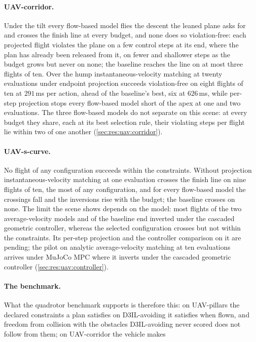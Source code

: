 \paragraph{UAV-corridor.} Under the tilt every flow-based model flies the descent the leaned plane asks
for and crosses the finish line at every budget, and none does so violation-free: each projected flight
violates the plane on a few control steps at its end, where the plan has already been released from it,
on fewer and shallower steps as the budget grows but never on none; the baseline reaches the line on at most three flights
of ten. Over the hump instantaneous-velocity matching at twenty evaluations under endpoint projection
succeeds violation-free on eight flights of ten at $291$\,ms per action, ahead of the baseline's best,
six at $626$\,ms, while per-step projection stops every flow-based model short of the apex at one and two
evaluations. The three flow-based models do not separate on this scene: at every budget they share, each
at its best selection rule, their violating steps per flight lie within two of one another
(\autoref{sec:res:uav:corridor}).

\paragraph{UAV-s-curve.} No flight of any configuration succeeds within the constraints. Without projection
instantaneous-velocity matching at one evaluation crosses the finish line on nine flights of ten, the most
of any configuration, and for every flow-based model the crossings fall and the inversions rise with the
budget; the baseline crosses on none. The limit the scene shows depends on the model: most flights of the
two average-velocity models and of the baseline end inverted under the cascaded geometric controller,
whereas the selected configuration crosses but not within the constraints. Its per-step projection and the
controller comparison on it are pending; the pilot on analytic average-velocity matching at ten evaluations
arrives under MuJoCo MPC where it inverts under the cascaded geometric controller
(\autoref{sec:res:uav:controller}).

\paragraph{The benchmark.} What the quadrotor benchmark supports is therefore this: on UAV-pillars the
declared constraints a plan satisfies on D3IL-avoiding it satisfies when flown, and freedom from collision
with the obstacles D3IL-avoiding never scored does not follow from them; on UAV-corridor the vehicle makes
